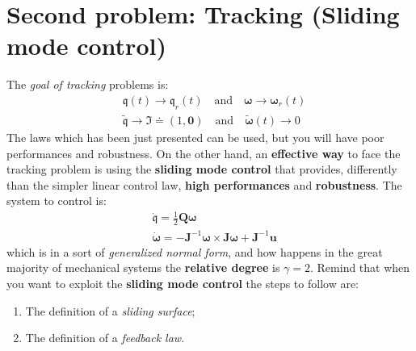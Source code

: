 \section{Second problem: Tracking (Sliding mode control)}
The \textit{goal of tracking} problems is:
\begin{align*}
    &\mathfrak{q}(t)\to\mathfrak{q}_r(t) \quad \text{and} \quad
    \boldsymbol{\omega}\to\boldsymbol{\omega}_r(t)\\
    &\tilde{\mathfrak{q}}\to\mathfrak{I}\doteq(1,\mathbf{0}) \quad \text{and} \quad \tilde{\boldsymbol{\omega}}(t)\to0
\end{align*}
The laws which has been just presented can be used, but you will have poor performances and robustness. On the other hand, an \textbf{effective way} to face the tracking problem is using the \textbf{sliding mode control} that provides, differently than the simpler linear control law, \textbf{high performances} and \textbf{robustness}.
The system to control is:
{\large{
    \begin{align*}
        &\dot{\mathfrak{q}} = \frac{1}{2}\mathbf{Q}\boldsymbol{\omega}\\
        &\dot{\boldsymbol{\omega}} = -\mathbf{J}^{-1}\boldsymbol{\omega} \times \mathbf{J}\boldsymbol{\omega}+\mathbf{J}^{-1}\mathbf{u}
    \end{align*}
}}
\noindent
which is in a sort of \textit{generalized normal form}, and how happens in the great majority of mechanical systems the \textbf{relative degree} is $\gamma=2$.
Remind that when you want to exploit the \textbf{sliding mode control} the steps to follow are:
\begin{enumerate}
    \item The definition of a \textit{sliding surface}; 
    \item The definition of a \textit{feedback law}.
\end{enumerate}

